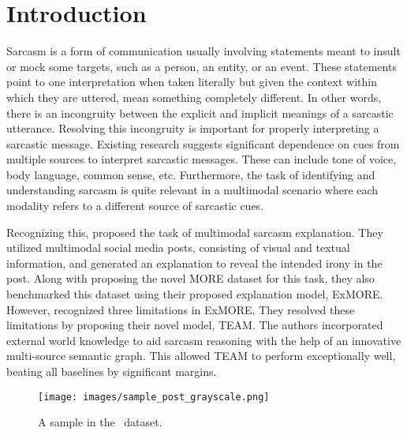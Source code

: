 \section{Introduction}\label{sec:intro}
Sarcasm is a form of communication usually involving statements meant to insult or mock some targets, such as a person, an entity, or an event. These statements point to one interpretation when taken literally but given the context within which they are uttered, mean something completely different. In other words, there is an incongruity between the explicit and implicit meanings of a sarcastic utterance. Resolving this incongruity is important for properly interpreting a sarcastic message. Existing research suggests significant dependence on cues from multiple sources to interpret sarcastic messages. These can include tone of voice, body language, common sense, etc. Furthermore, the task of identifying and understanding sarcasm is quite relevant in a multimodal scenario where each modality refers to a different source of sarcastic cues.

Recognizing this,  proposed the task of multimodal sarcasm explanation. They utilized multimodal social media posts, consisting of visual and textual information, and generated an explanation to reveal the intended irony in the post. 
Along with proposing the novel MORE dataset for this task, they also benchmarked this dataset using their proposed explanation model, ExMORE.
However,  recognized three limitations in ExMORE. They resolved these limitations by proposing their novel model, TEAM. The authors incorporated external world knowledge to aid sarcasm reasoning with the help of an innovative multi-source semantic graph. This allowed TEAM to perform exceptionally well, beating all baselines by significant margins. 
\begin{figure}[t]
  \texttt{[image: images/sample\_post\_grayscale.png]}
  \caption{A sample in the \dataset\ dataset.}
  \label{fig:example-post}
\end{figure}

